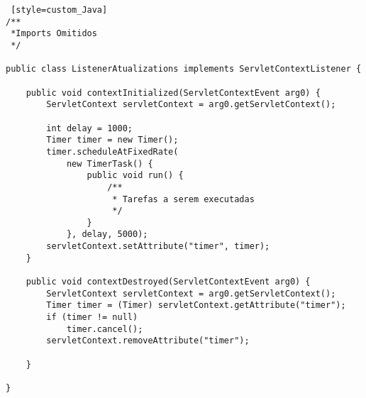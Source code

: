 \begin{lstlisting} [style=custom_Java] 	
/**
 *Imports Omitidos
 */

public class ListenerAtualizations implements ServletContextListener {

	public void contextInitialized(ServletContextEvent arg0) {
		ServletContext servletContext = arg0.getServletContext();

		int delay = 1000;
		Timer timer = new Timer();
		timer.scheduleAtFixedRate(
			new TimerTask() {
				public void run() {
					/**
					 * Tarefas a serem executadas
					 */
				}
			}, delay, 5000);
		servletContext.setAttribute("timer", timer);
	}

	public void contextDestroyed(ServletContextEvent arg0) {
		ServletContext servletContext = arg0.getServletContext();
		Timer timer = (Timer) servletContext.getAttribute("timer");
		if (timer != null)
			timer.cancel();
		servletContext.removeAttribute("timer");

	}

}
	
\end{lstlisting}

